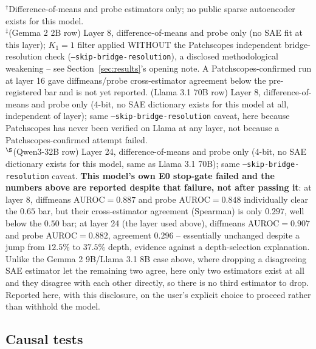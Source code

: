 \documentclass{article}
\begin{document}
\begin{center}
\vspace{2pt}
{\footnotesize $^{\dagger}$Difference-of-means and probe estimators only; no public sparse
autoencoder exists for this model.\\
$^{\ddagger}$(Gemma 2 2B row) Layer 8, difference-of-means and probe only (no SAE fit at this layer); $K_1{=}1$ filter
applied WITHOUT the Patchscopes independent bridge-resolution check
(\texttt{--skip-bridge-resolution}), a disclosed methodological weakening -- see
Section~\ref{sec:results}'s opening note. A Patchscopes-confirmed run at layer 16 gave
diffmeans/probe cross-estimator agreement below the pre-registered bar and is not yet reported.
(Llama 3.1 70B row) Layer 8, difference-of-means and probe only (4-bit, no SAE dictionary exists
for this model at all, independent of layer); same \texttt{--skip-bridge-resolution} caveat,
here because Patchscopes has never been verified on Llama at any layer, not because a
Patchscopes-confirmed attempt failed.\\
$^{\S}$(Qwen3-32B row) Layer 24, difference-of-means and probe only (4-bit, no SAE dictionary
exists for this model, same as Llama 3.1 70B); same \texttt{--skip-bridge-resolution} caveat.
\textbf{This model's own E0 stop-gate failed and the numbers above are reported despite that
failure, not after passing it}: at layer 8, diffmeans AUROC$=0.887$ and probe AUROC$=0.848$
individually clear the $0.65$ bar, but their cross-estimator agreement (Spearman) is only
$0.297$, well below the $0.50$ bar; at layer 24 (the layer used above), diffmeans
AUROC$=0.907$ and probe AUROC$=0.882$, agreement $0.296$ -- essentially unchanged despite
a jump from $12.5\%$ to $37.5\%$ depth, evidence against a depth-selection explanation.
Unlike the Gemma 2 9B/Llama 3.1 8B case above, where dropping a disagreeing SAE estimator let
the remaining two agree, here only two estimators exist at all and they disagree with each
other directly, so there is no third estimator to drop. Reported here, with this disclosure, on
the user's explicit choice to proceed rather than withhold the model.}
\vspace{-0.7em}
\end{center}




\subsection{Causal tests}
\label{sec:res-causal}
\vspace{-0.3em}
\end{document}
